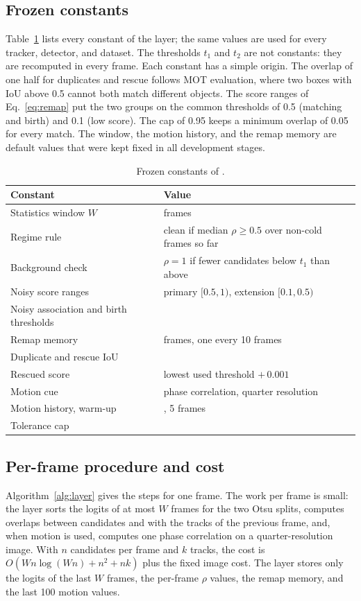 

\subsection{Frozen constants}\label{sec:constants}
Table~\ref{tab:constants} lists every constant of the layer; the same
values are used for every tracker, detector, and dataset. The thresholds
$t_1$ and $t_2$ are not constants: they are recomputed in every frame. Each
constant has a simple origin. The overlap of one half for duplicates and
rescue follows MOT evaluation, where two boxes with IoU above 0.5 cannot both
match different objects. The score ranges of Eq.~\eqref{eq:remap} put the
two groups on the common thresholds of 0.5 (matching and birth) and 0.1 (low
score). The cap of 0.95 keeps a minimum overlap of 0.05 for every match. The
window, the motion history, and the remap memory are default values that
were kept fixed in all development stages.

\begin{table}[t]
\caption{Frozen constants of \scl{}.}
\label{tab:constants}
\centering\footnotesize
\begin{tabular}{@{}>{\raggedright\arraybackslash}p{39mm}>{\raggedright\arraybackslash}p{31mm}@{}}
\toprule
Constant & Value\\
\midrule
Statistics window $W$ & 10 frames\\
Regime rule & clean if median $\rho\ge0.5$ over non-cold frames so far\\
Background check & $\rho=1$ if fewer candidates below $t_1$ than above\\
Noisy score ranges & primary $[0.5,1)$, extension $[0.1,0.5)$\\
Noisy association and birth thresholds & 0.5\\
Remap memory & 20 frames, one every 10 frames\\
Duplicate and rescue IoU & 0.5\\
Rescued score & lowest used threshold $+\,0.001$\\
Motion cue & phase correlation, quarter resolution\\
Motion history, warm-up & 100, 5 frames\\
Tolerance cap & 0.95\\
\bottomrule
\end{tabular}
\end{table}

\subsection{Per-frame procedure and cost}\label{sec:cost}
Algorithm~\ref{alg:layer} gives the steps for one frame. The work per
frame is small: the layer sorts the logits of at most $W$ frames for the two
Otsu splits, computes overlaps between candidates and with the tracks of the
previous frame, and, when motion is used, computes one phase correlation on
a quarter-resolution image. With $n$ candidates per frame and $k$ tracks,
the cost is $O(Wn\log(Wn)+n^2+nk)$ plus the fixed image cost. The layer
stores only the logits of the last $W$ frames, the per-frame $\rho$ values,
the remap memory, and the last 100 motion values.

